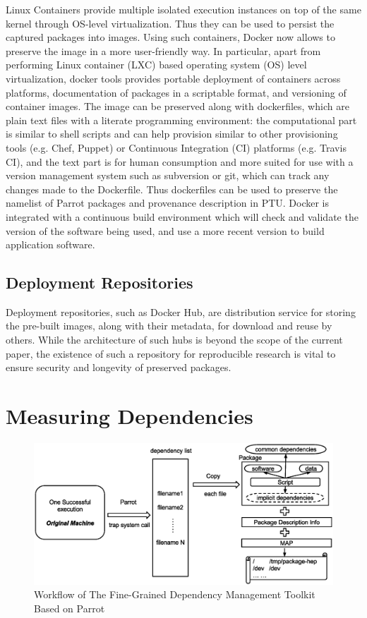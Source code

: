 Linux Containers provide multiple isolated execution instances on top of the same kernel through OS-level virtualization. Thus they can be used to persist the captured packages into images. Using such containers, Docker now allows to preserve the image in a more user-friendly way. In particular, apart from performing Linux container (LXC) based operating system (OS) level virtualization, docker tools provides portable deployment of containers across platforms, documentation of packages in a scriptable format, and versioning of container images. The image can be preserved along with dockerfiles, which are plain text files with a literate programming environment: the computational part is similar to shell scripts and can help provision similar to other provisioning tools (e.g. Chef, Puppet) or Continuous Integration (CI) platforms (e.g. Travis CI), and the text part is for human consumption and more suited for use with a version management system such as subversion or git, which can track any changes made to the Dockerfile. Thus dockerfiles can be used to preserve the namelist of Parrot packages and provenance description in PTU. 
Docker is integrated with a continuous build environment which will check and validate the version of the software being used, and use a more recent version to build application software. 


\subsection{Deployment  Repositories}
Deployment repositories, such as Docker Hub, are distribution service for storing the pre-built images, along with their metadata, for download and reuse by others. While the architecture of such hubs is beyond the scope of the current paper, the existence of such a repository for reproducible research is vital to ensure security and longevity of preserved packages. 

\section{Measuring Dependencies}

\begin{figure}
\centering
\includegraphics[width=.8\textwidth]{workflow-parrot.eps}
\caption{Workflow of The Fine-Grained Dependency Management Toolkit Based on Parrot}
\label{fig:workflow-parrot}
\end{figure}

